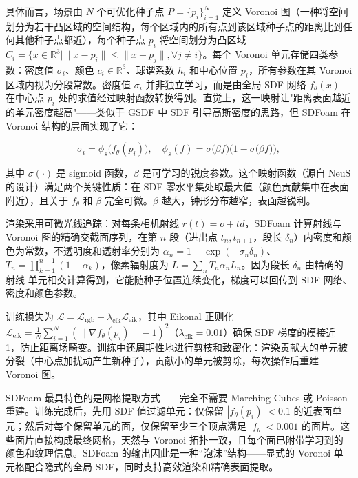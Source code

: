 具体而言，场景由 $N$ 个可优化种子点 $P=\{p_i\}_{i=1}^N$ 定义 Voronoi 图（一种将空间划分为若干凸区域的空间结构，每个区域内的所有点到该区域种子点的距离比到任何其他种子点都近），每个种子点 $p_i$ 将空间划分为凸区域 $C_i=\{x \in \mathbb{R}^3 \mid \|x-p_i\| \leq \|x-p_j\|, \forall j \neq i\}$。每个 Voronoi 单元存储四类参数：密度值 $\sigma_i$、颜色 $c_i \in \mathbb{R}^3$、球谐系数 $h_i$ 和中心位置 $p_i$，所有参数在其 Voronoi 区域内视为分段常数。密度值 $\sigma_i$ 并非独立学习，而是由全局 SDF 网络 $f_\theta(x)$ 在中心点 $p_i$ 处的求值经过映射函数转换得到。直觉上，这一映射让"距离表面越近的单元密度越高"——类似于 GSDF 中 SDF 引导高斯密度的思路，但 SDFoam 在 Voronoi 结构的层面实现了它：

\begin{equation}
  \sigma_i = \phi_s\bigl(f_\theta(p_i)\bigr), \quad \phi_s(f) = \sigma\bigl(\beta f\bigr)\bigl(1-\sigma\bigl(\beta f\bigr)\bigr),
\end{equation}

其中 $\sigma(\cdot)$ 是 sigmoid 函数，$\beta$ 是可学习的锐度参数。这个映射函数（源自 NeuS 的设计）满足两个关键性质：在 SDF 零水平集处取最大值（颜色贡献集中在表面附近），且关于 $f_\theta$ 和 $\beta$ 完全可微。$\beta$ 越大，钟形分布越窄，表面越锐利。

渲染采用可微光线追踪：对每条相机射线 $r(t)=o+td$，SDFoam 计算射线与 Voronoi 图的精确交截面序列，在第 $n$ 段（进出点 $t_n, t_{n+1}$，段长 $\delta_n$）内密度和颜色为常数，不透明度和透射率分别为 $\alpha_n=1-\exp(-\sigma_n \delta_n)$、$T_n=\prod_{k=1}^{n-1}(1-\alpha_k)$，像素辐射度为 $L=\sum_n T_n \alpha_n L_n$。因为段长 $\delta_n$ 由精确的射线-单元相交计算得到，它能随种子位置连续变化，梯度可以回传到 SDF 网络、密度和颜色参数。

训练损失为 $\mathcal{L}=\mathcal{L}_\text{rgb}+\lambda_\text{eik}\mathcal{L}_\text{eik}$，其中 Eikonal 正则化 $\mathcal{L}_\text{eik}=\frac{1}{N}\sum_{i=1}^N(\|\nabla f_\theta(p_i)\|-1)^2$（$\lambda_\text{eik}=0.01$）确保 SDF 梯度的模接近 1，防止距离场畸变。训练中还周期性地进行剪枝和致密化：渲染贡献大的单元被分裂（中心点加扰动产生新种子），贡献小的单元被剪除，每次操作后重建 Voronoi 图。

SDFoam 最具特色的是网格提取方式——完全不需要 Marching Cubes 或 Poisson 重建。训练完成后，先用 SDF 值过滤单元：仅保留 $|f_\theta(p_i)|<0.1$ 的近表面单元；然后对每个保留单元的面，仅保留至少三个顶点满足 $|f_\theta|<0.001$ 的面片。这些面片直接构成最终网格，天然与 Voronoi 拓扑一致，且每个面已附带学习到的颜色和纹理信息。SDFoam 的输出因此是一种“泡沫”结构——显式的 Voronoi 单元格配合隐式的全局 SDF，同时支持高效渲染和精确表面提取。

